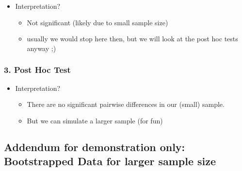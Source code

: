 \documentclass[
]{book}
\newenvironment{Shaded}{\begin{snugshade}}{\end{snugshade}}
\newcommand{\CommentTok}[1]{\textcolor[rgb]{0.56,0.35,0.01}{\textit{#1}}}
\newcommand{\FunctionTok}[1]{\textcolor[rgb]{0.13,0.29,0.53}{\textbf{#1}}}
\newcommand{\NormalTok}[1]{#1}
\providecommand{\tightlist}{%
  \setlength{\itemsep}{0pt}\setlength{\parskip}{0pt}}
\begin{document}
\begin{itemize}
\tightlist
\item
  Interpretation?

  \begin{itemize}
  \tightlist
  \item
    Not significant (likely due to small sample size)
  \item
    usually we would stop here then, but we will look at the post hoc tests anyway ;)
  \end{itemize}
\end{itemize}

\subsubsection*{3. Post Hoc Test}\label{post-hoc-test}

\begin{Shaded}
\end{Shaded}

\begin{itemize}
\tightlist
\item
  Interpretation?

  \begin{itemize}
  \item
    There are no significant pairwise differences in our (small) sample.
  \item
    But we can simulate a larger sample (for fun)
  \end{itemize}
\end{itemize}

\subsection{Addendum for demonstration only: Bootstrapped Data for larger sample size}\label{addendum-for-demonstration-only-bootstrapped-data-for-larger-sample-size}
\end{document}
